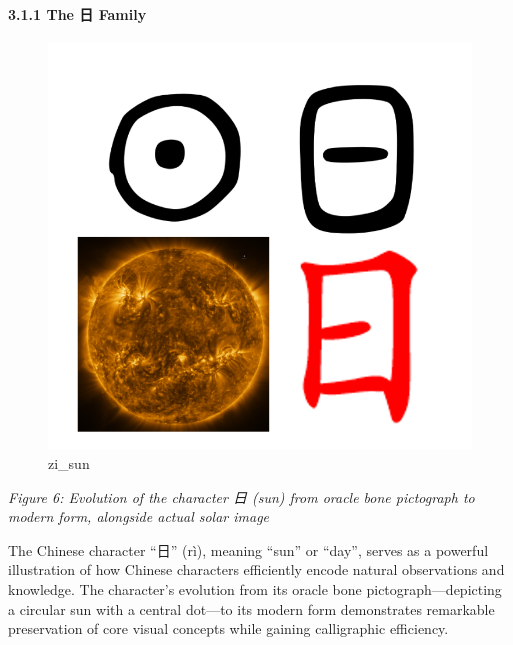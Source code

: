 \hypertarget{the-ux65e5-family}{%
\paragraph{3.1.1 The 日 Family}\label{the-ux65e5-family}}

\begin{figure}
\centering
\includegraphics{./images/zi_sun.png}
\caption{zi\_sun}
\end{figure}

\emph{Figure 6: Evolution of the character 日 (sun) from oracle bone
pictograph to modern form, alongside actual solar image}

The Chinese character ``日'' (rì), meaning ``sun'' or ``day'', serves as
a powerful illustration of how Chinese characters efficiently encode
natural observations and knowledge. The character's evolution from its
oracle bone pictograph---depicting a circular sun with a central
dot---to its modern form demonstrates remarkable preservation of core
visual concepts while gaining calligraphic efficiency.


